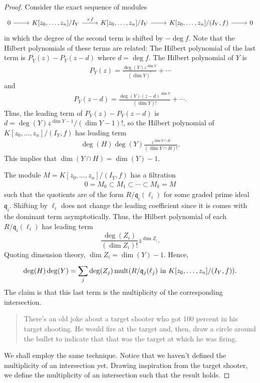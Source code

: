 \documentclass [11 pt, oneside] {article}
\begin{document}
\begin{proof}
Consider the exact sequence of modules
\[
\begin{tikzcd}
	0\ar[r] & K[z_0,\hdots,z_n] / I_Y \ar[r, "\times f"] & K[z_0,\hdots, z_n] /I_Y \ar[r] & K[z_0,\hdots, z_n]/(I_Y, f)\ar[r] &0
\end{tikzcd}
\]
in which the degree of the second term is shifted by $-\deg f$. Note that the Hilbert polynomials of these terms are related: The Hilbert polynomial of the last term is $P_Y(z) - P_Y (z-d)$ where $d=\deg f$. The Hilbert polynomial of $Y$ is
\begin{align*}
	P_Y(z) =  \frac{\deg(Y)z^{\dim Y}}{(\dim Y)^!}+\cdots
\end{align*}
and
\begin{align*}
	P_Y(z-d) =  \frac{\deg(Y) (z-d)^{\dim Y}}{(\dim Y)!}+\cdots.
\end{align*}
Thus, the leading term of $P_Y(z)-P_Y (z-d)$ is $d = \deg(Y) z^{\dim Y-1}/ (\dim Y- 1)!$, so the Hilbert polynomial of $K[z_0,\hdots,z_n]/(I_Y,f)$ has leading term
\begin{align*}
	\deg(H)\deg (Y)  \frac{z^{\dim Y\cap H}}{(\dim Y\cap H)!}.
\end{align*}
This implies that $\dim (Y\cap H) =\dim (Y)-1$. 

The module $M=K[z_0,\hdots, z_n]/(I_Y, f)$ has a filtration 
\begin{align*}
	0  = M_0\subset M_1\subset\cdots \subset M_k = M
\end{align*}
such that the quotients are of the form $R/\mathfrak{q}_i(\ell_i)$ for some graded prime ideal $\mathfrak{q}_i$. Shifting by $\ell_i$ does not change the leading coefficient since it is comes with the dominant term asymptotically. Thus, the Hilbert polynomial of each $R/\mathfrak{q}_i(\ell_i)$ has leading term
\[
	\frac{\deg (Z_i)}{(\dim Z_i)!}z^{\dim Z_i}.
\]
Quoting dimension theory, $\dim Z_i = \dim (Y)-1$. Hence, 
\begin{align*}
	\deg(H)\deg (Y) =  \sum_{j}^{} \deg(Z_j) \operatorname{mult} (R/\mathfrak{q}_j(\ell_j) \textrm{ in $K[z_0,\hdots, z_n]/(I_Y,f)$}).
\end{align*}
The claim is that this last term is the multiplicity of the corresponding intersection.
\begin{quote}
	\small There's an old joke about a target shooter who got 100 percent in his target shooting. He would fire at the target and, then, draw a circle around the bullet to indicate that that was the target at which he was firing. 
\end{quote}
We shall employ the same technique. Notice that we haven't defined the multiplicity of an intersection yet. Drawing inspiration from the target shooter, we define the multiplicity of an intersection such that the result holds. 
\end{proof}
\end{document}
